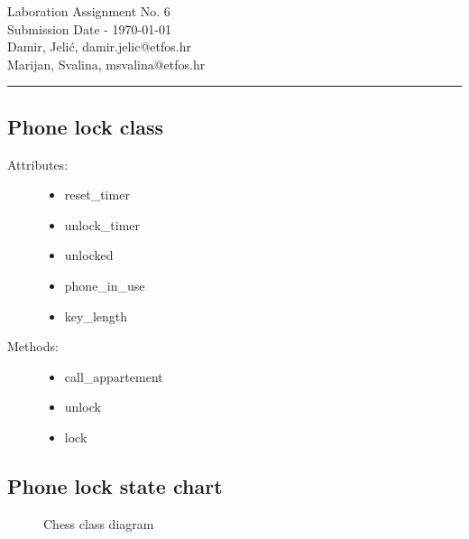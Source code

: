 \documentclass[11pt,a4paper]{article}
\begin{document}
\large
Laboration Assignment No. 6\\
Submission Date - \yyyymmdddate \today \\
Damir, Jelić, damir.jelic@etfos.hr \\
Marijan, Svalina, msvalina@etfos.hr
\\
\rule{\linewidth}{0.1mm}

\setcounter{section}{6}
\subsection{Phone lock class}
\begin{description}
    \item[Attributes:] \hfill
    \begin{itemize}
        \item reset\_timer
        \item unlock\_timer
        \item unlocked
        \item phone\_in\_use
        \item key\_length
    \end{itemize}
    \item[Methods:] \hfill
    \begin{itemize}
        \item call\_appartement
        \item unlock
        \item lock
    \end{itemize}
\end{description}

\newpage

\subsection{Phone lock state chart}
\begin{figure}[htb]
    \begin{center}
        \setlength\fboxsep{0pt}
        \caption{Chess class diagram}
        \label{fig:class_diag}
    \end{center}
\end{figure}
\end{document}
